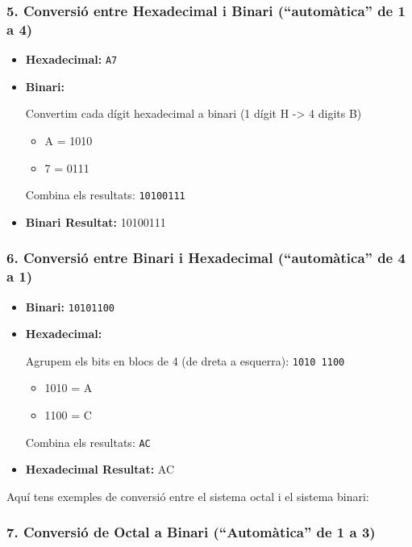 \documentclass[
  12 pt,
  a4paper,
]{article}
\providecommand{\tightlist}{%
  \setlength{\itemsep}{0pt}\setlength{\parskip}{0pt}}
\begin{document}
\subsubsection{5. Conversió entre Hexadecimal i Binari (``automàtica''
de 1 a
4)}\label{conversiuxf3-entre-hexadecimal-i-binari-automuxe0tica-de-1-a-4}

\begin{itemize}
\item
  \textbf{Hexadecimal:} \texttt{A7}
\item
  \textbf{Binari:}

  Convertim cada dígit hexadecimal a binari (1 dígit H -\textgreater{} 4
  digits B)

  \begin{itemize}
  \tightlist
  \item
    A = 1010
  \item
    7 = 0111
  \end{itemize}

  Combina els resultats: \texttt{10100111}
\item
  \textbf{Binari Resultat:} 10100111
\end{itemize}

\subsubsection{6. Conversió entre Binari i Hexadecimal (``automàtica''
de 4 a
1)}\label{conversiuxf3-entre-binari-i-hexadecimal-automuxe0tica-de-4-a-1}

\begin{itemize}
\item
  \textbf{Binari:} \texttt{10101100}
\item
  \textbf{Hexadecimal:}

  Agrupem els bits en blocs de 4 (de dreta a esquerra):
  \texttt{1010\ 1100}

  \begin{itemize}
  \tightlist
  \item
    1010 = A
  \item
    1100 = C
  \end{itemize}

  Combina els resultats: \texttt{AC}
\item
  \textbf{Hexadecimal Resultat:} AC
\end{itemize}

Aquí tens exemples de conversió entre el sistema octal i el sistema
binari:

\subsubsection{7. Conversió de Octal a Binari (``Automàtica'' de 1 a
3)}\label{conversiuxf3-de-octal-a-binari-automuxe0tica-de-1-a-3}
\end{document}
